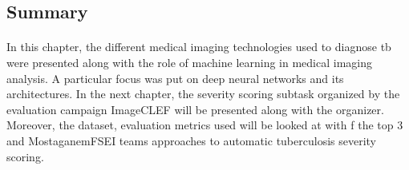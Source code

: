 \subsection*{Summary}
\paragraph{}
In this chapter, the different medical imaging technologies used to diagnose \acs{tb} were presented along with the role of machine learning in medical imaging analysis. A particular focus was put on deep neural networks and its architectures. In the next chapter, the severity scoring subtask organized by the evaluation campaign ImageCLEF will be presented along with the organizer. Moreover, the dataset, evaluation metrics used will be looked at with f the top 3 and MostaganemFSEI teams approaches to automatic tuberculosis severity scoring.